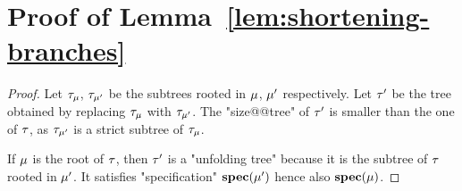 \section{Proof of Lemma~\ref{lem:shortening-branches}}
\label{app:proofs-reduction-branches}

\lemShorteningBranches*

\begin{proof}
	Let $\tau_{\mu}$, $\tau_{\mu'}$ be the subtrees rooted in $\mu$, $\mu'$ respectively. 
	Let $\tau'$ be the tree obtained by replacing $\tau_{\mu}$ with $\tau_{\mu'}$. The "size@@tree" of $\tau'$ is smaller than the one of $\tau$, as $\tau_{\mu'}$ is a strict subtree of $\tau_{\mu}$.
	
	If $\mu$ is the root of $\tau$, then $\tau'$ is a "unfolding tree" because it is the subtree of $\tau$ rooted in $\mu'$. It satisfies "specification" $\mathbf{spec}(\mu')$ hence also $\mathbf{spec}(\mu)$. 
	



	

\end{proof}
